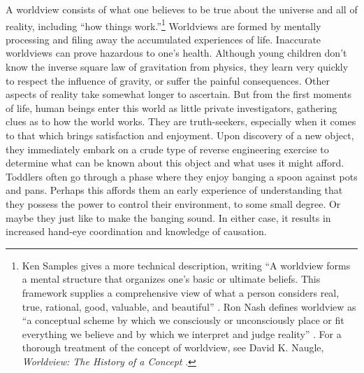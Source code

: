 A worldview consists of what one believes to be true about the universe
and all of reality, including “how things work.”\footnote{Ken Samples gives a more technical description,
writing “A worldview forms a mental structure that organizes one’s
basic or ultimate beliefs. This framework supplies a comprehensive view
of what a person considers real, true, rational, good, valuable, and
beautiful” \citep[][p.~20]{samples2007}.
Ron Nash defines worldview as “a conceptual scheme by
which we consciously or unconsciously place or fit everything we
believe and by which we interpret and judge reality” \citep[][p.~24]{nash1988}.
For a thorough treatment of the concept
of worldview, see David K. Naugle, \textit{Worldview: The History of a
Concept} \citep{naugle2002}.
} 
Worldviews are formed by mentally processing and filing away the
accumulated experiences of life. Inaccurate worldviews can prove
hazardous to one’s health. Although young children don’t know the
inverse square law of gravitation from physics, they learn very quickly
to respect the influence of gravity, or suffer the painful
consequences. Other aspects of reality take somewhat longer to
ascertain. But from the first moments of life, human beings enter this
world as little private investigators, gathering clues as to how the world
works. They are truth-seekers, especially when it comes to that which
brings satisfaction and enjoyment. Upon discovery of a new object, they
immediately embark on a crude type of reverse engineering exercise to
determine what can be known about this object and what uses it might
afford. Toddlers often go through a phase where they enjoy banging a
spoon against pots and pans. Perhaps this affords them an early
experience of understanding that they possess the power to control
their environment, to some small degree. Or maybe they just like to
make the banging sound. In either case, it results in increased
hand-eye coordination and knowledge of causation.

